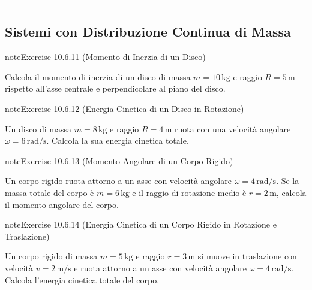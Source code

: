 \documentclass[letterpaper,10pt,italian]{jupyterBook}
\begin{document}
\bigskip\hrule\bigskip



\subsection{Sistemi con Distribuzione Continua di Massa}
\label{\detokenize{ch/mechanics/inertia-problems:sistemi-con-distribuzione-continua-di-massa}} \label{exercise:ch/mechanics/inertia-problems-exercise-10}

\begin{sphinxadmonition}{note}{Exercise 10.6.11 (Momento di Inerzia di un Disco)}



\sphinxAtStartPar
Calcola il momento di inerzia di un disco di massa \(m = 10 \, \text{kg}\) e raggio \(R = 5 \, \text{m}\) rispetto all’asse centrale e perpendicolare al piano del disco.
\end{sphinxadmonition}
 \label{exercise:ch/mechanics/inertia-problems-exercise-11}

\begin{sphinxadmonition}{note}{Exercise 10.6.12 (Energia Cinetica di un Disco in Rotazione)}



\sphinxAtStartPar
Un disco di massa \(m = 8 \, \text{kg}\) e raggio \(R = 4 \, \text{m}\) ruota con una velocità angolare \(\omega = 6 \, \text{rad/s}\). Calcola la sua energia cinetica totale.
\end{sphinxadmonition}
 \label{exercise:ch/mechanics/inertia-problems-exercise-12}

\begin{sphinxadmonition}{note}{Exercise 10.6.13 (Momento Angolare di un Corpo Rigido)}



\sphinxAtStartPar
Un corpo rigido ruota attorno a un asse con velocità angolare \(\omega = 4 \, \text{rad/s}\). Se la massa totale del corpo è \(m = 6 \, \text{kg}\) e il raggio di rotazione medio è \(r = 2 \, \text{m}\), calcola il momento angolare del corpo.
\end{sphinxadmonition}
 \label{exercise:ch/mechanics/inertia-problems-exercise-13}

\begin{sphinxadmonition}{note}{Exercise 10.6.14 (Energia Cinetica di un Corpo Rigido in Rotazione e Traslazione)}



\sphinxAtStartPar
Un corpo rigido di massa \(m = 5 \, \text{kg}\) e raggio \(r = 3 \, \text{m}\) si muove in traslazione con velocità \(v = 2 \, \text{m/s}\) e ruota attorno a un asse con velocità angolare \(\omega = 4 \, \text{rad/s}\). Calcola l’energia cinetica totale del corpo.
\end{sphinxadmonition}
 \label{exercise:ch/mechanics/inertia-problems-exercise-14}
\end{document}

